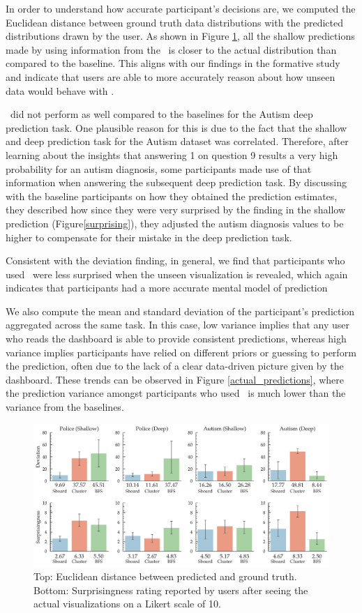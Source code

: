  In order to understand how accurate participant's decisions are, we computed the Euclidean distance between ground truth data distributions with the predicted distributions drawn by the user. As shown in Figure \ref{distance}, all the shallow predictions made by using information from the \system\ is closer to the actual distribution than compared to the baseline. This aligns with our findings in the formative study and indicate that users are able to more accurately reason about how unseen data would behave with \system.
\par \system\ did not perform as well compared to the baselines for the Autism deep prediction task. One plausible reason for this is due to the fact that the shallow and deep prediction task for the Autism dataset was correlated. Therefore, after learning about the insights that answering 1 on question 9 results a very high probability for an autism diagnosis, some participants made use of that information when answering the subsequent deep prediction task. By discussing with the baseline participants on how they obtained the prediction estimates, they described how since they were very surprised by the finding in the shallow prediction (Figure\ref{surprising}), they adjusted the autism diagnosis values to be higher to compensate for their mistake in the deep prediction task. 
\par Consistent with the deviation finding, in general, we find that participants who used \system\ were less surprised when the unseen visualization is revealed, which again indicates that participants had a more accurate mental model of prediction 
\par We also compute the mean and standard deviation of the participant's prediction aggregated across the same task. In this case, low variance implies that any user who reads the dashboard is able to provide consistent predictions, whereas high variance implies participants have relied on different priors or guessing to perform the prediction, often due to the lack of a clear data-driven picture given by the dashboard. These trends can be observed in Figure \ref{actual_predictions}, where the prediction variance amongst participants who used \system\ is much lower than the variance from the baselines.
\begin{figure}[bht]
\label{distance}
\centering
\includegraphics[width=\linewidth]{figures/Devation_Surprisingness.pdf}
\caption{Top: Euclidean distance between predicted and ground truth. Bottom: Surprisingness rating reported by users after seeing the actual visualizations on a Likert scale of 10.}
\end{figure}
